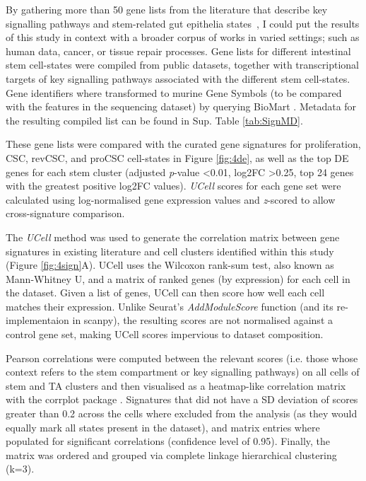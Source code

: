 By gathering more than 50 gene lists from the literature that describe key signalling pathways and stem-related gut epithelia states~\cite{ayyaz_single-cell_2019, vasquez_molecular_2022, alvarez-varela_mex3a_2022, mustata_identification_2013,  yui_yaptaz-dependent_2018, munoz_lgr5_2012, li_reference_2017, han_lineage_2020, merlos-suarez_intestinal_2011, dalerba_single-cell_2011, pelka_spatially_2021, gregorieff_yap-dependent_2015, canellas-socias_metastatic_2022, wang_comprehensive_2018, mourao_lineage_2019, barriga_mex3a_2017, bues_deterministic_2022, morral_zonation_2020}, I could put the results of this study in context with a broader corpus of works in varied settings; such as human data, cancer, or tissue repair processes.
Gene lists for different intestinal stem cell-states were compiled from public datasets, together with transcriptional targets of key signalling pathways associated with the different stem cell-states. Gene identifiers where transformed to murine Gene Symbols (to be compared with the features in the sequencing dataset) by querying BioMart \cite{smedley_biomart_2009}. Metadata for the resulting compiled list can be found in Sup. Table \ref{tab:SignMD}.

These gene lists were compared with the curated gene signatures for proliferation, CSC, revCSC, and proCSC cell-states in Figure \ref{fig:4de}, as well as the top DE genes for each stem cluster (adjusted \emph{p}-value \textless 0.01, log2FC \textgreater 0.25, top 24 genes with the greatest positive log2FC values). \textit{UCell} scores for each gene set were calculated using log-normalised gene expression values and \emph{z}-scored to allow cross-signature comparison.

The \textit{UCell} \cite{andreatta_ucell_2021} method was used to generate the correlation matrix between gene signatures in existing literature and cell clusters identified within this study (Figure \ref{fig:4sign}A). UCell uses the Wilcoxon rank-sum test, also known as Mann-Whitney U, and a matrix of ranked genes (by expression) for each cell in the dataset. Given a list of genes, UCell can then score how well each cell matches their expression. Unlike Seurat's \emph{AddModuleScore} function (and its re-implementaion in scanpy), the resulting scores are not normalised against a control gene set, making UCell scores impervious to dataset composition. 

Pearson correlations were computed between the relevant scores (i.e. those whose context refers to the stem compartment or key signalling pathways) on all cells of stem and TA clusters and then visualised as a heatmap-like correlation matrix with the corrplot package \cite{wei_r_2021}. Signatures that did not have a SD deviation of scores greater than 0.2 across the cells where excluded from the analysis (as they would equally mark all states present in the dataset), and matrix entries where populated for significant correlations (confidence level of 0.95). Finally, the matrix was ordered and grouped via complete linkage hierarchical clustering (k=3). 


